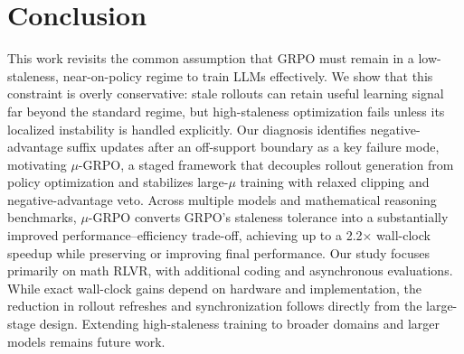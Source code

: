 \section{Conclusion} \label{sec:conclusion_and_discussion}  This work revisits the common assumption that GRPO must remain in a low-staleness, near-on-policy regime to train LLMs effectively. We show that this constraint is overly conservative: stale rollouts can retain useful learning signal far beyond the standard regime, but high-staleness optimization fails unless its localized instability is handled explicitly. Our diagnosis identifies negative-advantage suffix updates after an off-support boundary as a key failure mode, motivating $\mu$-GRPO, a staged framework that decouples rollout generation from policy optimization and stabilizes large-$\mu$ training with relaxed clipping and negative-advantage veto. Across multiple models and mathematical reasoning benchmarks, $\mu$-GRPO converts GRPO's staleness tolerance into a substantially improved performance--efficiency trade-off, achieving up to a 2.2$\times$ wall-clock speedup while preserving or improving final performance. Our study focuses primarily on math RLVR, with additional coding and asynchronous evaluations. While exact wall-clock gains depend on hardware and implementation, the reduction in rollout refreshes and synchronization follows directly from the large-stage design. Extending high-staleness training to broader domains and larger models remains future work.